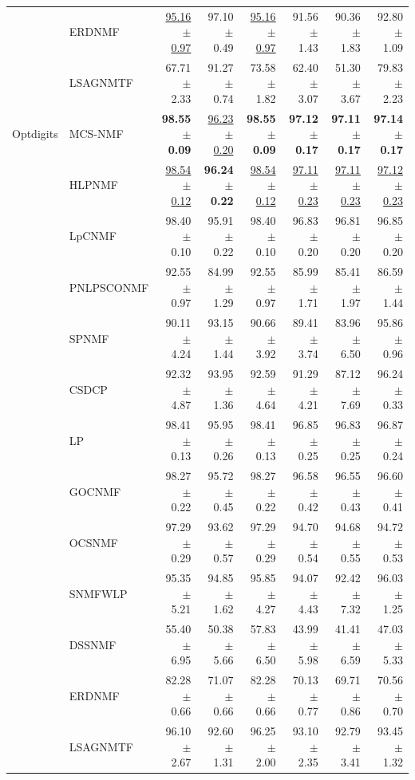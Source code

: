 \begin{landscape}
\begin{longtable}{llrrrrrr}
 & ERDNMF & \underline{95.16 $\pm$ 0.97} & 97.10 $\pm$ 0.49 & \underline{95.16 $\pm$ 0.97} & 91.56 $\pm$ 1.43 & 90.36 $\pm$ 1.83 & 92.80 $\pm$ 1.09 \\
 & LSAGNMTF & 67.71 $\pm$ 2.33 & 91.27 $\pm$ 0.74 & 73.58 $\pm$ 1.82 & 62.40 $\pm$ 3.07 & 51.30 $\pm$ 3.67 & 79.83 $\pm$ 2.23 \\
\midrule
Optdigits & MCS-NMF & \textbf{98.55 $\pm$ 0.09} & \underline{96.23 $\pm$ 0.20} & \textbf{98.55 $\pm$ 0.09} & \textbf{97.12 $\pm$ 0.17} & \textbf{97.11 $\pm$ 0.17} & \textbf{97.14 $\pm$ 0.17} \\
 & HLPNMF & \underline{98.54 $\pm$ 0.12} & \textbf{96.24 $\pm$ 0.22} & \underline{98.54 $\pm$ 0.12} & \underline{97.11 $\pm$ 0.23} & \underline{97.11 $\pm$ 0.23} & \underline{97.12 $\pm$ 0.23} \\
 & LpCNMF & 98.40 $\pm$ 0.10 & 95.91 $\pm$ 0.22 & 98.40 $\pm$ 0.10 & 96.83 $\pm$ 0.20 & 96.81 $\pm$ 0.20 & 96.85 $\pm$ 0.20 \\
 & PNLPSCONMF & 92.55 $\pm$ 0.97 & 84.99 $\pm$ 1.29 & 92.55 $\pm$ 0.97 & 85.99 $\pm$ 1.71 & 85.41 $\pm$ 1.97 & 86.59 $\pm$ 1.44 \\
 & SPNMF & 90.11 $\pm$ 4.24 & 93.15 $\pm$ 1.44 & 90.66 $\pm$ 3.92 & 89.41 $\pm$ 3.74 & 83.96 $\pm$ 6.50 & 95.86 $\pm$ 0.96 \\
 & CSDCP & 92.32 $\pm$ 4.87 & 93.95 $\pm$ 1.36 & 92.59 $\pm$ 4.64 & 91.29 $\pm$ 4.21 & 87.12 $\pm$ 7.69 & 96.24 $\pm$ 0.33 \\
 & LP & 98.41 $\pm$ 0.13 & 95.95 $\pm$ 0.26 & 98.41 $\pm$ 0.13 & 96.85 $\pm$ 0.25 & 96.83 $\pm$ 0.25 & 96.87 $\pm$ 0.24 \\
 & GOCNMF & 98.27 $\pm$ 0.22 & 95.72 $\pm$ 0.45 & 98.27 $\pm$ 0.22 & 96.58 $\pm$ 0.42 & 96.55 $\pm$ 0.43 & 96.60 $\pm$ 0.41 \\
 & OCSNMF & 97.29 $\pm$ 0.29 & 93.62 $\pm$ 0.57 & 97.29 $\pm$ 0.29 & 94.70 $\pm$ 0.54 & 94.68 $\pm$ 0.55 & 94.72 $\pm$ 0.53 \\
 & SNMFWLP & 95.35 $\pm$ 5.21 & 94.85 $\pm$ 1.62 & 95.85 $\pm$ 4.27 & 94.07 $\pm$ 4.43 & 92.42 $\pm$ 7.32 & 96.03 $\pm$ 1.25 \\
 & DSSNMF & 55.40 $\pm$ 6.95 & 50.38 $\pm$ 5.66 & 57.83 $\pm$ 6.50 & 43.99 $\pm$ 5.98 & 41.41 $\pm$ 6.59 & 47.03 $\pm$ 5.33 \\
 & ERDNMF & 82.28 $\pm$ 0.66 & 71.07 $\pm$ 0.66 & 82.28 $\pm$ 0.66 & 70.13 $\pm$ 0.77 & 69.71 $\pm$ 0.86 & 70.56 $\pm$ 0.70 \\
 & LSAGNMTF & 96.10 $\pm$ 2.67 & 92.60 $\pm$ 1.31 & 96.25 $\pm$ 2.00 & 93.10 $\pm$ 2.35 & 92.79 $\pm$ 3.41 & 93.45 $\pm$ 1.32 \\
\bottomrule
\end{longtable}
\end{landscape}
